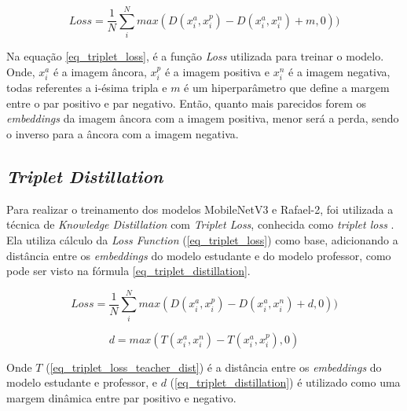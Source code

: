 \begin{equation}\label{eq_triplet_loss}
	Loss = \frac 1 N \sum _i ^N max(D(x_i^a, x_i^p) - D(x_i^a, x_i^n) + m, 0))
\end{equation}
%
%

Na equação \ref{eq_triplet_loss}, é a função \textit{Loss} utilizada para treinar o modelo. Onde, $x_i^a$ é
a imagem âncora, $x_i^p$ é a imagem positiva e $x_i^n$ é a imagem negativa, todas referentes a i-ésima
tripla e $m$ é um hiperparâmetro que define a margem entre o par positivo e par negativo.
Então, quanto mais parecidos forem os \textit{embeddings} da imagem âncora com a imagem positiva,
menor será a perda, sendo o inverso para a âncora com a imagem negativa.

\subsection{\textit{Triplet Distillation}}
Para realizar o treinamento dos modelos MobileNetV3 e Rafael-2, foi utilizada a técnica de
\textit{Knowledge Distillation} \cite{hinton2015distilling} com \textit{Triplet Loss}, conhecida como
\textit{triplet loss} \cite{triplet_distillation_face_recognition}.
Ela utiliza cálculo da \textit{Loss Function} (\ref{eq_triplet_loss}) como base, adicionando a distância entre os
\textit{embeddings} do modelo estudante e do modelo professor, como pode ser visto na fórmula
\ref{eq_triplet_distillation}.

\begin{equation}\label{eq_triplet_distillation}
	Loss = \frac 1 N \sum _i ^N max(D(x_i^a, x_i^p) - D(x_i^a, x_i^n) + d, 0))
\end{equation}

\begin{equation}\label{eq_triplet_loss_teacher_dist}
	d = max(T(x_i^a, x_i^n) - T(x_i^a, x_i^p), 0)
\end{equation}

Onde $T$ (\ref{eq_triplet_loss_teacher_dist}) é a distância entre os \textit{embeddings} do modelo estudante e
professor, e $d$ (\ref{eq_triplet_distillation}) é utilizado como uma margem dinâmica entre par positivo e negativo.


